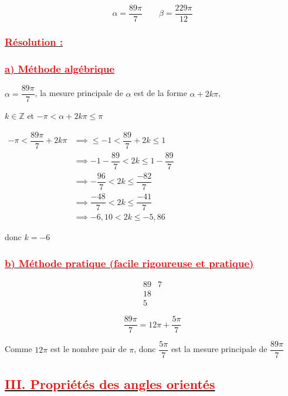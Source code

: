 \documentclass[a4paper,12pt]{article}
\begin{document}
\[
\alpha = \dfrac{89\pi}{7} \qquad \beta = \dfrac{229\pi}{12}
\]
\subsubsection*{\underline{\textcolor{red}{Résolution :}}}

\subsubsection*{\underline{\textcolor{red}{a) Méthode algébrique}}}

\(
\alpha = \dfrac{89\pi}{7}
\), la mesure principale de \( \alpha \) est de la forme \( \alpha + 2k\pi \),

\( k \in \mathbb{Z} \) et \( -\pi < \alpha + 2k\pi \leq \pi \)

\( 
\begin{aligned}
-\pi < \dfrac{89\pi}{7} + 2k\pi &\implies \leq  -1 <  \dfrac{89}{7} + 2k \leq 1 \\
        &\implies -1 - \dfrac{89}{7} < 2k \leq 1 - \dfrac{89}{7}\\
        &\implies -\dfrac{96}{7} < 2k \leq \dfrac{-82}{7}\\
        &\implies \dfrac{-48}{7} < 2k \leq \dfrac{-41}{7}\\
        &\implies -6{,}10 < 2k \leq -5{,}86
\end{aligned}
\)

donc $\boxed{k =-6}$

\subsubsection*{\underline{\textcolor{red}{b) Méthode pratique (facile rigoureuse et pratique)}}}

\[
\begin{array}{c|c}
89 & 7 \\
\hline
18 &  \\
5 & 
\end{array}
\]

\[
\dfrac{89\pi}{7} = 12\pi + \dfrac{5\pi}{7}
\]

Comme \( 12\pi \) est le nombre pair de \( \pi \), donc \( \dfrac{5\pi}{7} \) est la mesure principale de \( \dfrac{89\pi}{7} \)

\subsection*{\underline{\textcolor{red}{III. Propriétés des angles orientés}}}
\end{document}
